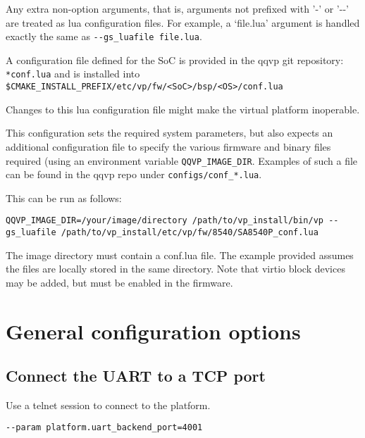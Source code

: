 Any extra non-option arguments, that is, arguments not prefixed with '-' or '-{}-'
are treated as lua configuration files. For example, a `file.lua' argument is handled
exactly the same as {\footnotesize{\lstinline!--gs_luafile file.lua!}}.


A configuration file defined for the SoC is provided in the qqvp git
repository: {\small{\lstinline!*conf.lua!}} and is installed into
{\small{\lstinline!$CMAKE_INSTALL_PREFIX/etc/vp/fw/<SoC>/bsp/<OS>/conf.lua!}}

\caution Changes to this lua configuration file might make the virtual platform inoperable.

This configuration sets the required system parameters,
but also expects an additional configuration file to specify the
various firmware and binary files required (using an environment variable
{\small{\lstinline!QQVP_IMAGE_DIR!}}.  Examples of such a file can be found
in the qqvp repo under {\small{\lstinline!configs/conf_*.lua!}}.

This can be run as follows:

{\small{\lstinline!QQVP_IMAGE_DIR=/your/image/directory /path/to/vp_install/bin/vp --gs_luafile /path/to/vp_install/etc/vp/fw/8540/SA8540P_conf.lua!}}

The image directory must contain a conf.lua file. The example provided assumes
the files are locally stored in the same directory. Note that
virtio block devices may be added, but must be enabled in the firmware.

\clearpage
\section{General configuration options}

\subsection{Connect the UART to a TCP port}

Use a telnet session to connect to the platform. \leavevmode

\small
\begin{lstlisting}[language=bash]
    --param platform.uart_backend_port=4001
\end{lstlisting}
\normalsize


